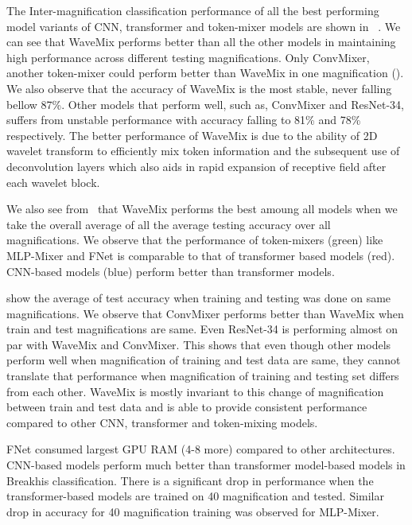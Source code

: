 \documentclass[nohyperref]{article}
\theoremstyle{plain}
\theoremstyle{definition}
\theoremstyle{remark}
\begin{document}
The Inter-magnification classification performance of all the best performing model variants of CNN, transformer and token-mixer models are shown in ~. We can see that WaveMix performs better than all the other models in maintaining high performance across different testing magnifications. Only ConvMixer, another token-mixer could perform better than WaveMix in one magnification (). We also observe that the accuracy of WaveMix  is the most stable, never falling bellow 87\%. Other models that perform well, such as, ConvMixer  and ResNet-34, suffers from unstable performance with accuracy falling to 81\% and 78\% respectively. The better performance of WaveMix is due to the ability of 2D wavelet transform to efficiently mix token information and the subsequent use of deconvolution layers which also aids in rapid expansion of receptive field after each wavelet block.

We also see from~ that WaveMix performs the best amoung all models when we take the overall average of all the average testing accuracy over all magnifications. We observe that the performance of token-mixers (green) like MLP-Mixer and FNet is comparable to that of transformer based models (red). CNN-based models (blue) perform better than transformer models. 

 show the average of test accuracy when training and testing was done on same magnifications. We observe that ConvMixer performs better than WaveMix when train and test magnifications are same. Even ResNet-34 is performing almost on par with WaveMix and ConvMixer. This shows that even though other models perform well when magnification of training and test data are same, they cannot translate that performance when magnification of training and testing set differs from each other. WaveMix is mostly invariant to this change of magnification between train and test data and is able to provide consistent performance compared to other CNN, transformer and token-mixing models.


FNet consumed largest GPU RAM (4-8 more) compared to other architectures. CNN-based models perform much better than transformer model-based models in Breakhis classification. There is a significant drop in performance when the transformer-based models are trained on 40 magnification and tested. Similar drop in accuracy for 40 magnification training was observed for MLP-Mixer.
\end{document}

